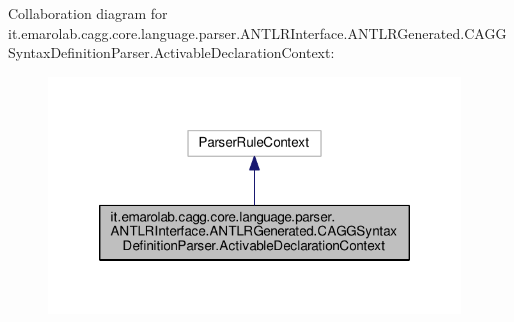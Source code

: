 Collaboration diagram for it.\-emarolab.\-cagg.\-core.\-language.\-parser.\-A\-N\-T\-L\-R\-Interface.\-A\-N\-T\-L\-R\-Generated.\-C\-A\-G\-G\-Syntax\-Definition\-Parser.\-Activable\-Declaration\-Context\-:
\nopagebreak
\begin{figure}[H]
\begin{center}
\leavevmode
\includegraphics[width=310pt]{classit_1_1emarolab_1_1cagg_1_1core_1_1language_1_1parser_1_1ANTLRInterface_1_1ANTLRGenerated_1_1ab99c004ca6096367ccaa841d4a1801}
\end{center}
\end{figure}
